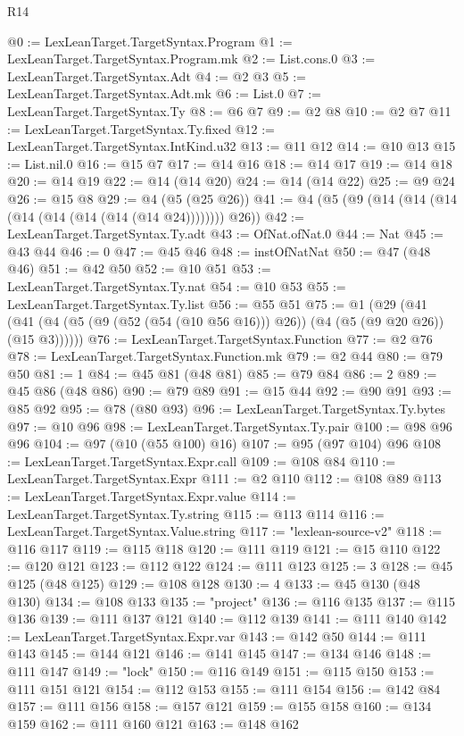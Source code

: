 \begin{lexlean}{R14}
\begin{coremodule}
@0 := LexLeanTarget.TargetSyntax.Program
@1 := LexLeanTarget.TargetSyntax.Program.mk
@2 := List.cons.{0}
@3 := LexLeanTarget.TargetSyntax.Adt
@4 := @2 @3
@5 := LexLeanTarget.TargetSyntax.Adt.mk
@6 := List.{0}
@7 := LexLeanTarget.TargetSyntax.Ty
@8 := @6 @7
@9 := @2 @8
@10 := @2 @7
@11 := LexLeanTarget.TargetSyntax.Ty.fixed
@12 := LexLeanTarget.TargetSyntax.IntKind.u32
@13 := @11 @12
@14 := @10 @13
@15 := List.nil.{0}
@16 := @15 @7
@17 := @14 @16
@18 := @14 @17
@19 := @14 @18
@20 := @14 @19
@22 := @14 (@14 @20)
@24 := @14 (@14 @22)
@25 := @9 @24
@26 := @15 @8
@29 := @4 (@5 (@25 @26))
@41 := @4 (@5 (@9 (@14 (@14 (@14 (@14 (@14 (@14 (@14 (@14 @24)))))))) @26))
@42 := LexLeanTarget.TargetSyntax.Ty.adt
@43 := OfNat.ofNat.{0}
@44 := Nat
@45 := @43 @44
@46 := 0
@47 := @45 @46
@48 := instOfNatNat
@50 := @47 (@48 @46)
@51 := @42 @50
@52 := @10 @51
@53 := LexLeanTarget.TargetSyntax.Ty.nat
@54 := @10 @53
@55 := LexLeanTarget.TargetSyntax.Ty.list
@56 := @55 @51
@75 := @1
    (@29 (@41 (@41 (@4 (@5 (@9 (@52 (@54 (@10 @56 @16))) @26)) (@4 (@5 (@9 @20 @26)) (@15 @3))))))
@76 := LexLeanTarget.TargetSyntax.Function
@77 := @2 @76
@78 := LexLeanTarget.TargetSyntax.Function.mk
@79 := @2 @44
@80 := @79 @50
@81 := 1
@84 := @45 @81 (@48 @81)
@85 := @79 @84
@86 := 2
@89 := @45 @86 (@48 @86)
@90 := @79 @89
@91 := @15 @44
@92 := @90 @91
@93 := @85 @92
@95 := @78 (@80 @93)
@96 := LexLeanTarget.TargetSyntax.Ty.bytes
@97 := @10 @96
@98 := LexLeanTarget.TargetSyntax.Ty.pair
@100 := @98 @96 @96
@104 := @97 (@10 (@55 @100) @16)
@107 := @95 (@97 @104) @96
@108 := LexLeanTarget.TargetSyntax.Expr.call
@109 := @108 @84
@110 := LexLeanTarget.TargetSyntax.Expr
@111 := @2 @110
@112 := @108 @89
@113 := LexLeanTarget.TargetSyntax.Expr.value
@114 := LexLeanTarget.TargetSyntax.Ty.string
@115 := @113 @114
@116 := LexLeanTarget.TargetSyntax.Value.string
@117 := "lexlean-source-v2"
@118 := @116 @117
@119 := @115 @118
@120 := @111 @119
@121 := @15 @110
@122 := @120 @121
@123 := @112 @122
@124 := @111 @123
@125 := 3
@128 := @45 @125 (@48 @125)
@129 := @108 @128
@130 := 4
@133 := @45 @130 (@48 @130)
@134 := @108 @133
@135 := "project"
@136 := @116 @135
@137 := @115 @136
@139 := @111 @137 @121
@140 := @112 @139
@141 := @111 @140
@142 := LexLeanTarget.TargetSyntax.Expr.var
@143 := @142 @50
@144 := @111 @143
@145 := @144 @121
@146 := @141 @145
@147 := @134 @146
@148 := @111 @147
@149 := "lock"
@150 := @116 @149
@151 := @115 @150
@153 := @111 @151 @121
@154 := @112 @153
@155 := @111 @154
@156 := @142 @84
@157 := @111 @156
@158 := @157 @121
@159 := @155 @158
@160 := @134 @159
@162 := @111 @160 @121
@163 := @148 @162

\end{coremodule}
\end{lexlean}
